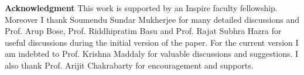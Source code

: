 \documentclass[12pt]{article}
\numberwithin{equation}{section}
\numberwithin{equation}{section}
\theoremstyle{definition}
\renewcommand{\1}{\bf 1}
\begin{document}
\noindent 
\textbf{Acknowledgment} This work is supported by an Inspire faculty fellowship. Moreover I thank Soumendu Sundar Mukherjee for many detailed discussions and Prof. Arup Bose, Prof. Riddhipratim Basu and Prof.  Rajat Subhra Hazra for useful discussions during the initial version of the paper. For the current version I am indebted to Prof. Krishna Maddaly for valuable discussions and suggestions. I also thank Prof. Arijit Chakrabarty for encouragement and supports. 
 
 
\end{document}

